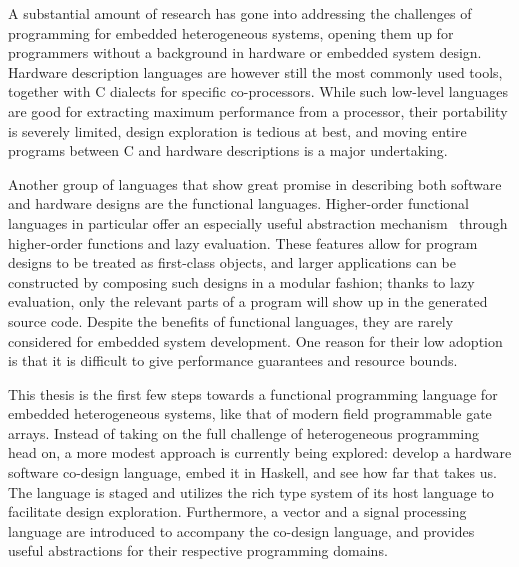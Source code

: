 \documentclass[../paper.tex]{subfiles}
\begin{document}

A substantial amount of research has gone into addressing the challenges of programming for embedded heterogeneous systems, opening them up for programmers without a background in hardware or embedded system design. Hardware description languages are however still the most commonly used tools, together with C dialects for specific co-processors. While such low-level languages are good for extracting maximum performance from a processor, their portability is severely limited, design exploration is tedious at best, and moving entire programs between C and hardware descriptions is a major undertaking.

Another group of languages that show great promise in describing both software and hardware designs are the functional languages. Higher-order functional languages in particular offer an especially useful abstraction mechanism~\cite{baaij2010, bjesse1998, gill2010} through higher-order functions and lazy evaluation. These features allow for program designs to be treated as first-class objects, and larger applications can be constructed by composing such designs in a modular fashion; thanks to lazy evaluation, only the relevant parts of a program will show up in the generated source code. Despite the benefits of functional languages, they are rarely considered for embedded system development. One reason for their low adoption is that it is difficult to give performance guarantees and resource bounds.


This thesis is the first few steps towards a functional programming language for embedded heterogeneous systems, like that of modern field programmable gate arrays. Instead of taking on the full challenge of heterogeneous programming head on, a more modest approach is currently being explored: develop a hardware software co-design language, embed it in Haskell, and see how far that takes us. The language is staged and utilizes the rich type system of its host language to facilitate design exploration. Furthermore, a vector and a signal processing language are introduced to accompany the co-design language, and provides useful abstractions for their respective programming domains.
\end{document}
